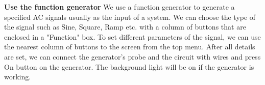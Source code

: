 \textbf{Use the function generator} \newline
\phantom{ } We use a function generator to generate a specified AC signals usually as the input of a system. We can choose the type of the signal such as Sine, Square, Ramp etc. with a column of buttons that are enclosed in a "Function" box. To set different parameters of the signal, we can use the nearest column of buttons to the screen from the top menu. After all details are set, we can connect the generator's probe and the circuit with wires and press On button on the generator. The background light will be on if the generator is working.\\